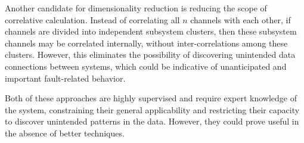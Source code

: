 Another candidate for dimensionality reduction is reducing the scope of correlative calculation. Instead of correlating all $n$ channels with each other, if channels are divided into independent subsystem clusters, then these subsystem channels may be correlated internally, without inter-correlations among these clusters. However, this eliminates the possibility of discovering unintended data connections between systems, which could be indicative of unanticipated and important fault-related behavior.

Both of these approaches are highly supervised and require expert knowledge of the system, constraining their general applicability and restricting their capacity to discover unintended patterns in the data. However, they could prove useful in the absence of better techniques.











